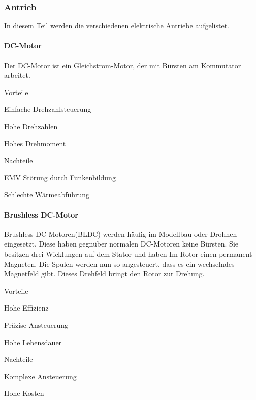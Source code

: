 \documentclass[../main.tex]{subfiles}
\begin{document}
\subsubsection{Antrieb}

In diesem Teil werden die verschiedenen elektrische Antriebe aufgelistet. 

\paragraph{DC-Motor}

Der DC-Motor ist ein Gleichstrom-Motor, der mit Bürsten am Kommutator arbeitet. 

\begin{minipage}[t]{0.48\textwidth}
\begin{items}
  \item [Vorteile]
  \item Einfache Drehzahlsteuerung
  \item Hohe Drehzahlen
  \item Hohes Drehmoment
\end{items}
\end{minipage}
\hfill
\begin{minipage}[t]{0.48\textwidth}
\begin{items}
  \item [Nachteile]
  \item EMV Störung durch Funkenbildung
  \item Schlechte Wärmeabführung
\end{items}
\end{minipage}

\paragraph{Brushless DC-Motor}

Brushless DC Motoren(BLDC) werden häufig im Modellbau oder Drohnen eingesetzt. Diese haben gegnüber normalen DC-Motoren keine Bürsten. Sie besitzen drei Wicklungen auf dem Stator und haben Im Rotor einen permanent Magneten. Die Spulen werden nun so angesteuert, dass es ein wechselndes Magnetfeld gibt. Dieses Drehfeld bringt den Rotor zur Drehung. 

\begin{minipage}[t]{0.48\textwidth}
\begin{items}
  \item [Vorteile]
  \item Hohe Effizienz
  \item Präzise Ansteuerung
  \item Hohe Lebensdauer
\end{items}
\end{minipage}
\hfill
\begin{minipage}[t]{0.48\textwidth}
\begin{items}
  \item [Nachteile]
  \item Komplexe Ansteuerung
  \item Hohe Kosten
\end{items}
\end{minipage}
\end{document}
